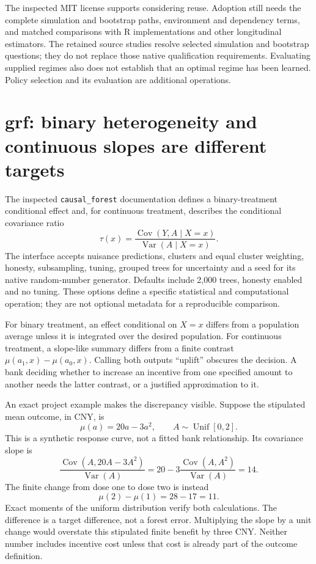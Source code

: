 The inspected MIT license supports considering reuse. Adoption still needs the
complete simulation and bootstrap paths, environment and dependency terms, and
matched comparisons with R implementations and other longitudinal estimators.
The retained source studies resolve selected simulation and bootstrap questions;
they do not replace those native qualification requirements.
Evaluating supplied regimes also does not establish that an optimal regime has
been learned. Policy selection and its evaluation are additional operations.

\section{grf: binary heterogeneity and continuous slopes are different targets}

The inspected \texttt{causal\_forest} documentation defines a binary-treatment
conditional effect and, for continuous treatment, describes the conditional
covariance ratio
\[
 \tau(x)=\frac{\operatorname{Cov}(Y,A\mid X=x)}
                    {\operatorname{Var}(A\mid X=x)}.
\]
The interface accepts nuisance predictions, clusters and equal cluster
weighting, honesty, subsampling, tuning, grouped trees for uncertainty and a
seed for its native random-number generator. Defaults include 2,000 trees,
honesty enabled and no tuning. These options define a specific statistical and
computational operation; they are not optional metadata for a reproducible
comparison. \cite{v13_sw_grf}

For binary treatment, an effect conditional on $X=x$ differs from a population
average unless it is integrated over the desired population. For continuous
treatment, a slope-like summary differs from a finite contrast
$\mu(a_1,x)-\mu(a_0,x)$. Calling both outputs ``uplift'' obscures the decision.
A bank deciding whether to increase an incentive from one specified amount to
another needs the latter contrast, or a justified approximation to it.

An exact project example makes the discrepancy visible. Suppose the stipulated
mean outcome, in CNY, is
\[
 \mu(a)=20a-3a^2,\qquad A\sim\operatorname{Unif}[0,2].
\]
This is a synthetic response curve, not a fitted bank relationship. Its
covariance slope is
\[
 \frac{\operatorname{Cov}(A,20A-3A^2)}{\operatorname{Var}(A)}
 =20-3\frac{\operatorname{Cov}(A,A^2)}{\operatorname{Var}(A)}=14.
\]
The finite change from dose one to dose two is instead
\[
 \mu(2)-\mu(1)=28-17=11.
\]
Exact moments of the uniform distribution verify both calculations. The
difference is a target difference, not a forest error. Multiplying the slope
by a unit change would overstate this stipulated finite benefit by three CNY.
Neither number includes incentive cost unless that cost is already part of the
outcome definition. \cite{v13_project_exact}

